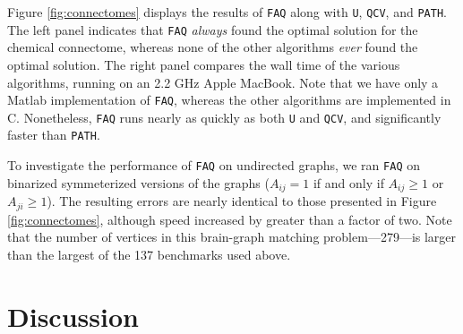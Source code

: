 \documentclass[11pt]{article}
\newcommand{\FAQ}{\texttt{FAQ} }
\begin{document}
Figure \ref{fig:connectomes} displays the results of \FAQ along with \texttt{U}, \texttt{QCV},  and \texttt{PATH}.  The left panel indicates that \FAQ \emph{always} found the optimal solution for the chemical connectome, whereas none of the other algorithms \emph{ever} found the optimal solution.  The right panel compares the wall time of the various algorithms, running on an 2.2 GHz Apple MacBook. Note that we have only a Matlab implementation of \texttt{FAQ}, whereas the other algorithms are implemented in C.  Nonetheless, \FAQ runs nearly as quickly as both \texttt{U} and \texttt{QCV}, and significantly faster than \texttt{PATH}.  %



To investigate the performance of \FAQ on undirected graphs, we ran \FAQ on binarized symmeterized versions of the graphs ($A_{ij}=1$ if and only if $A_{ij}\geq 1$ or $A_{ji} \geq 1$).  The resulting errors are nearly identical to those presented in Figure \ref{fig:connectomes}, although speed increased by greater than a factor of two. Note that the number of vertices in this brain-graph matching problem---279---is larger than the largest of the 137 benchmarks used above. 




\section{Discussion}
\label{sec:discussion}
\end{document}
